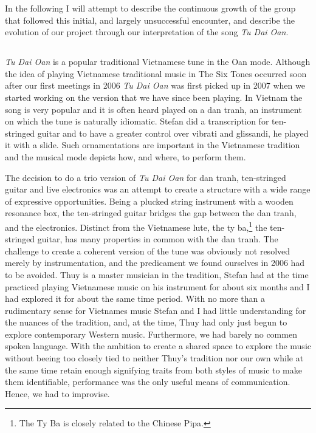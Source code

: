 \documentclass[a4paper]{article}
\begin{document}
In the following I will attempt to describe the continuous growth of the group that followed this initial, and largely unsuccessful encounter, and describe the evolution of our project through our interpretation of the song \emph{Tu Dai Oan}.



\subsection*{ }
\label{sec:tu-ddai-oan}

\emph{Tu Dai Oan} is a popular traditional Vietnamese tune in the Oan mode. Although the idea of playing Vietnamese traditional music in The Six Tones occurred soon after our first meetings in 2006 \emph{Tu Dai Oan} was first picked up in 2007 when we started working on the version that we have since been playing. In Vietnam the song is very popular and it is often heard played on a dan tranh, an instrument on which the tune is naturally idiomatic. Stefan did a transcription for ten-stringed guitar and to have a greater control over vibrati and glissandi, he played it with a slide. Such ornamentations are important in the Vietnamese tradition and the musical mode depicts how, and where, to perform them.

The decision to do a trio version of \emph{Tu Dai Oan} for dan tranh, ten-stringed guitar and live electronics was an attempt to create a structure with a wide range of expressive opportunities. Being a plucked string instrument with a wooden resonance box, the ten-stringed guitar bridges the gap between the dan tranh, and the electronics. Distinct from the Vietnamese lute, the ty ba,\footnote{The Ty Ba is closely related to the Chinese Pipa.} the ten-stringed guitar, has many properties in common with the dan tranh. The challenge to create a coherent version of the tune was obviously not resolved merely by instrumentation, and the predicament we found ourselves in 2006 had to be avoided. Thuy is a master musician in the tradition, Stefan had at the time practiced playing Vietnamese music on his instrument for about six months and I had explored it for about the same time period. With no more than a rudimentary sense for Vietnames music Stefan and I had little understanding for the nuances of the tradition, and, at the time, Thuy had only just begun to explore contemporary Western music. Furthermore, we had barely no commen spoken language. With the ambition to create a shared space to explore the music without beeing too closely tied to neither Thuy's tradition nor our own while at the same time retain enough signifying traits from both styles of music to make them identifiable, performance was the only useful means of communication. Hence, we had to improvise. 
\end{document}
